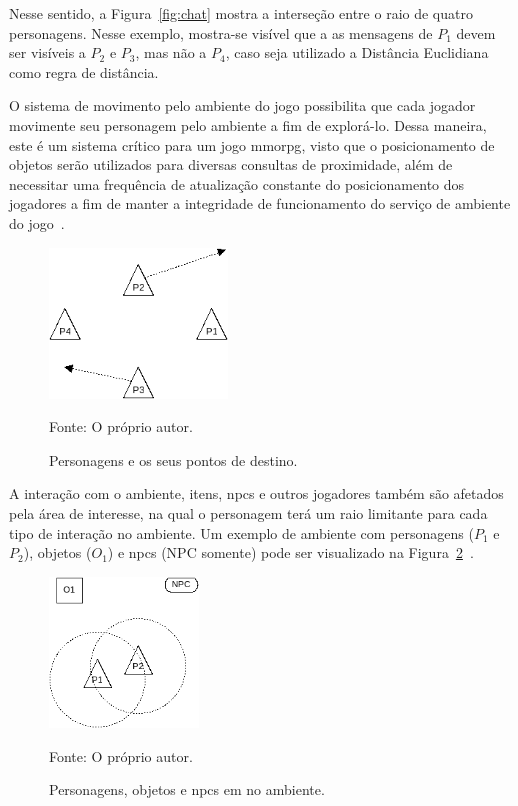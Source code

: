Nesse sentido, a Figura~\ref{fig:chat} mostra a interseção entre o raio de quatro personagens.
%
Nesse exemplo, mostra-se visível que a as mensagens de $P_1$ devem ser visíveis a $P_2$ e $P_3$, mas não a $P_4$, caso seja utilizado a Distância Euclidiana como regra de distância.



O sistema de movimento pelo ambiente do jogo possibilita que cada jogador movimente seu personagem pelo ambiente a fim de explorá-lo.
%
Dessa maneira, este é um sistema crítico para um jogo \ac{mmorpg}, visto que o posicionamento de objetos serão utilizados para diversas consultas de proximidade, além de necessitar uma frequência de atualização constante do posicionamento dos jogadores a fim de manter a integridade de funcionamento do serviço de ambiente do jogo~\cite{albion_online_unite}.


\begin{figure}[htb!]
\caption{Personagens e os seus pontos de destino.}
\label{fig:walk}
\includegraphics[height=4cm]{img/cap2/walk.png}
\centering

Fonte: O próprio autor.
\end{figure}



A interação com o ambiente, itens, \acp{npc} e outros jogadores também são afetados pela área de interesse, na qual o personagem terá um raio limitante para cada tipo de interação no ambiente.
%
Um exemplo de ambiente com personagens ($P_1$ e $P_2$), objetos ($O_1$) e \acp{npc} (NPC somente) pode ser visualizado na Figura~\ref{fig:obj_e_npc1}~\cite{albion_online_unite}.

\begin{figure}[htb!]
\caption{Personagens, objetos e \acp{npc} em no ambiente.}
\label{fig:obj_e_npc1}
\includegraphics[height=4cm]{img/cap2/obj_e_npc1.png}
\centering

Fonte: O próprio autor.
\end{figure}

